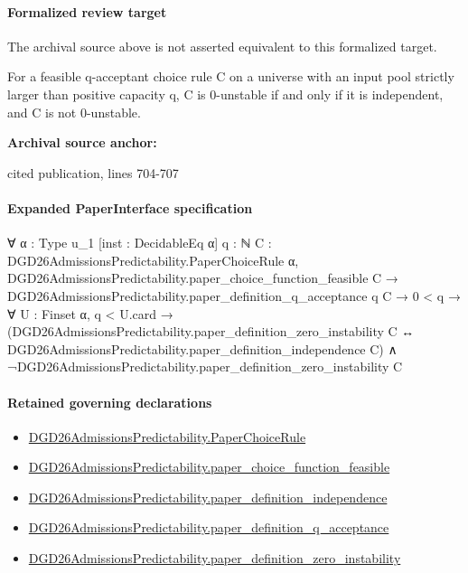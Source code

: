 \documentclass[10pt]{article}
\begin{document}
\paragraph{Formalized review target}
The archival source above is not asserted equivalent to this formalized target.
\begin{ReviewVerbatim}
For a feasible q-acceptant choice rule C on a universe with an input pool strictly larger than positive capacity q, C is 0-unstable if and only if it is independent, and C is not 0-unstable.
\end{ReviewVerbatim}

\textbf{Archival source anchor:} {\footnotesize\raggedright cited publication, lines 704-\allowbreak{}707\par}
\paragraph{Expanded PaperInterface specification}
\begin{ReviewVerbatim}
∀ {α : Type u_1} [inst : DecidableEq α] {q : ℕ} {C : DGD26AdmissionsPredictability.PaperChoiceRule α},
  DGD26AdmissionsPredictability.paper_choice_function_feasible C →
    DGD26AdmissionsPredictability.paper_definition_q_acceptance q C →
      0 < q →
        ∀ {U : Finset α},
          q < U.card →
            (DGD26AdmissionsPredictability.paper_definition_zero_instability C ↔
                DGD26AdmissionsPredictability.paper_definition_independence C) ∧
              ¬DGD26AdmissionsPredictability.paper_definition_zero_instability C
\end{ReviewVerbatim}

\paragraph{Retained governing declarations}
\begin{itemize}\raggedright
\item \hyperlink{governing-declaration-4678951b4432b184}{DGD26\allowbreak{}Admissions\allowbreak{}Predictability.\allowbreak{}Paper\allowbreak{}Choice\allowbreak{}Rule}
\item \hyperlink{governing-declaration-f7de74a44053f6d5}{DGD26\allowbreak{}Admissions\allowbreak{}Predictability.\allowbreak{}paper\_\allowbreak{}choice\_\allowbreak{}function\_\allowbreak{}feasible}
\item \hyperlink{governing-declaration-707bee77009ecc4d}{DGD26\allowbreak{}Admissions\allowbreak{}Predictability.\allowbreak{}paper\_\allowbreak{}definition\_\allowbreak{}independence}
\item \hyperlink{governing-declaration-7ecd62274fb2f391}{DGD26\allowbreak{}Admissions\allowbreak{}Predictability.\allowbreak{}paper\_\allowbreak{}definition\_\allowbreak{}q\_\allowbreak{}acceptance}
\item \hyperlink{governing-declaration-c23ecf0aa84721c4}{DGD26\allowbreak{}Admissions\allowbreak{}Predictability.\allowbreak{}paper\_\allowbreak{}definition\_\allowbreak{}zero\_\allowbreak{}instability}
\end{itemize}
\end{document}

